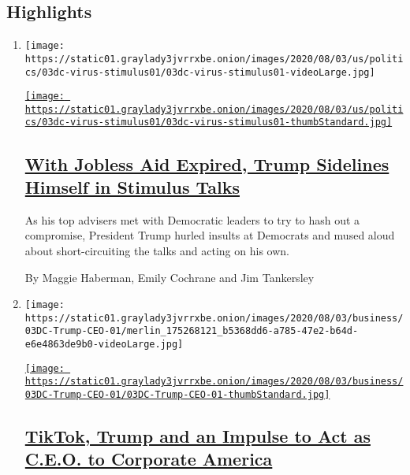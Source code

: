 \hypertarget{highlights}{%
\subsection{Highlights}\label{highlights}}

\begin{enumerate}
\def\labelenumi{\arabic{enumi}.}
\item
  \texttt{[image: https://static01.graylady3jvrrxbe.onion/images/2020/08/03/us/politics/03dc-virus-stimulus01/03dc-virus-stimulus01-videoLarge.jpg]}

  \href{/2020/08/03/us/politics/congress-jobless-aid-talks-trump.html}{\texttt{[image: https://static01.graylady3jvrrxbe.onion/images/2020/08/03/us/politics/03dc-virus-stimulus01/03dc-virus-stimulus01-thumbStandard.jpg]}}

  \hypertarget{with-jobless-aid-expired-trump-sidelines-himself-in-stimulus-talks}{%
  \subsection{\texorpdfstring{\href{/2020/08/03/us/politics/congress-jobless-aid-talks-trump.html}{With
  Jobless Aid Expired, Trump Sidelines Himself in Stimulus
  Talks}}{With Jobless Aid Expired, Trump Sidelines Himself in Stimulus Talks}}\label{with-jobless-aid-expired-trump-sidelines-himself-in-stimulus-talks}}

  As his top advisers met with Democratic leaders to try to hash out a
  compromise, President Trump hurled insults at Democrats and mused
  aloud about short-circuiting the talks and acting on his own.

  By Maggie Haberman, Emily Cochrane and Jim Tankersley
\item
  \texttt{[image: https://static01.graylady3jvrrxbe.onion/images/2020/08/03/business/03DC-Trump-CEO-01/merlin\_175268121\_b5368dd6-a785-47e2-b64d-e6e4863de9b0-videoLarge.jpg]}

  \href{/2020/08/03/business/economy/trump-tiktok-china-business.html}{\texttt{[image: https://static01.graylady3jvrrxbe.onion/images/2020/08/03/business/03DC-Trump-CEO-01/03DC-Trump-CEO-01-thumbStandard.jpg]}}

  \hypertarget{tiktok-trump-and-an-impulse-to-act-as-ceo-to-corporate-america}{%
  \subsection{\texorpdfstring{\href{/2020/08/03/business/economy/trump-tiktok-china-business.html}{TikTok,
  Trump and an Impulse to Act as C.E.O. to Corporate
  America}}{TikTok, Trump and an Impulse to Act as C.E.O. to Corporate America}}\label{tiktok-trump-and-an-impulse-to-act-as-ceo-to-corporate-america}}


\end{enumerate}

